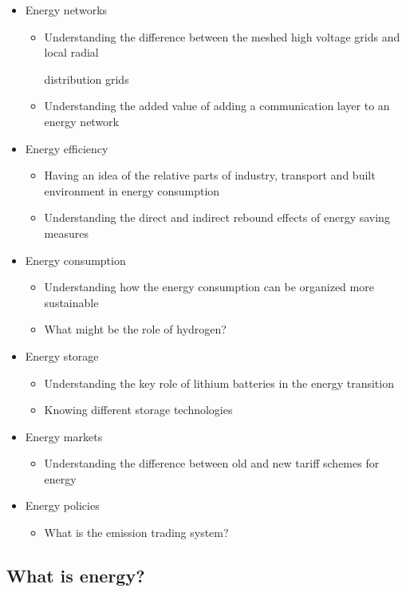 \documentclass[../summary.tex]{subfiles}
\begin{document}
\begin{itemize}
		\item Energy networks
		\begin{itemize}
			\item Understanding the difference between the meshed high voltage grids and local radial 
			
			distribution grids
			\item Understanding the added value of adding a communication layer to an energy network
		\end{itemize}
		
		\item Energy efficiency
		\begin{itemize}
			\item Having an idea of the relative parts of industry, transport and built environment in energy consumption
			\item Understanding the direct and indirect rebound effects of energy saving measures
		\end{itemize}
		
		\item Energy consumption
		\begin{itemize}
			\item Understanding how the energy consumption can be organized more sustainable
			\item What might be the role of hydrogen?
		\end{itemize}
		
		\item Energy storage
		\begin{itemize}
			\item Understanding the key role of lithium batteries in the energy transition
			\item Knowing different storage technologies
		\end{itemize}
		
		\item Energy markets
		\begin{itemize}
			\item Understanding the difference between old and new tariff schemes for energy
		\end{itemize}
		
		\item Energy policies
		\begin{itemize}
			\item What is the emission trading system?
		\end{itemize}
	\end{itemize}
	\newpage
	\subsection{What is energy?}
	
\end{document}
